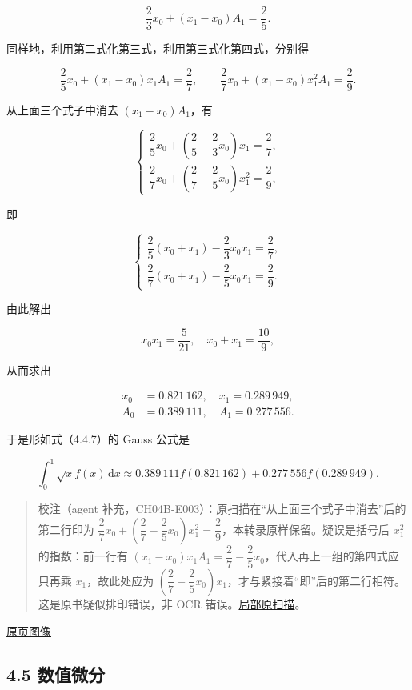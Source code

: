 \documentclass[
  10pt,
  fontset=fandol]{ctexart}
\begin{document}
\[
\frac23x_0+(x_1-x_0)A_1=\frac25.
\]

同样地，利用第二式化第三式，利用第三式化第四式，分别得

\[
\frac25x_0+(x_1-x_0)x_1A_1=\frac27,\qquad
\frac27x_0+(x_1-x_0)x_1^2A_1=\frac29.
\]

从上面三个式子中消去 \((x_1-x_0)A_1\)，有

\[
\begin{cases}
\dfrac25x_0+\left(\dfrac25-\dfrac23x_0\right)x_1=\dfrac27,\\[5pt]
\dfrac27x_0+\left(\dfrac27-\dfrac25x_0\right)x_1^2=\dfrac29,
\end{cases}
\]

即

\[
\begin{cases}
\dfrac25(x_0+x_1)-\dfrac23x_0x_1=\dfrac27,\\[5pt]
\dfrac27(x_0+x_1)-\dfrac25x_0x_1=\dfrac29.
\end{cases}
\]

由此解出

\[
x_0x_1=\frac5{21},\quad x_0+x_1=\frac{10}9,
\]

从而求出

\[
\begin{aligned}
x_0&=0.821\,162,\quad x_1=0.289\,949,\\
A_0&=0.389\,111,\quad A_1=0.277\,556.
\end{aligned}
\]

于是形如式（4.4.7）的 Gauss 公式是

\[
\int_0^1\sqrt{x}f(x)\,\mathrm{d}x
\approx0.389\,111f(0.821\,162)+0.277\,556f(0.289\,949).
\]

\begin{quote}
校注（agent 补充，CH04B-E003）：原扫描在``从上面三个式子中消去''后的第二行印为 \(\dfrac27x_0+\left(\dfrac27-\dfrac25x_0\right)x_1^2=\dfrac29\)，本转录原样保留。疑误是括号后 \(x_1^2\) 的指数：前一行有 \((x_1-x_0)x_1A_1=\dfrac27-\dfrac25x_0\)，代入再上一组的第四式应只再乘 \(x_1\)，故此处应为 \(\left(\dfrac27-\dfrac25x_0\right)x_1\)，才与紧接着``即''后的第二行相符。这是原书疑似排印错误，非 OCR 错误。\href{../assets/ch04b/review-p111-elimination.png}{局部原扫描}。
\end{quote}

\href{../../source-images/pdf-112.jpeg}{原页图像}

\subsection{4.5 数值微分}\label{ux6570ux503cux5faeux5206}
\end{document}
